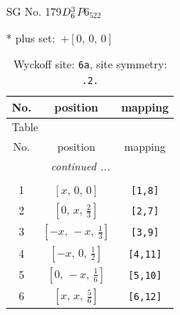 \documentclass[fleqn,8pt]{jsarticle}
\begin{document}
\setcounter{MaxMatrixCols}{32}

\renewcommand{\tablename}{Table~}
\renewcommand{\figurename}{Figure~}
\begin{center}
\LARGE
SG No. 179\quad$D_{\rm 6}^{3}$\quad$P6_522$\quad[ hexagonal ]
\end{center}
* plus set:\,\,\,$+\left[ 0,\, 0,\, 0 \right]$
\renewcommand{\arraystretch}{1.2}
\begin{longtable}{ccc}
\caption{Wyckoff site: {\tt 6a}, site symmetry: {\tt .2.}}
 \\
 \hline \hline
No. & position & mapping \\ \hline \endfirsthead

\multicolumn{2}{l}{\tablename\ \thetable{}} \\
 \hline \hline
No. & position & mapping \\ \hline \endhead

 \hline \hline
\multicolumn{2}{r}{\footnotesize\it continued ...} \\ \endfoot

 \hline \hline
\multicolumn{2}{r}{} \\ \endlastfoot

1 & $\left[ x,\, 0,\, 0 \right]$ & {\tt [1,8]} \\ \hline
2 & $\left[ 0,\, x,\, \frac{2}{3} \right]$ & {\tt [2,7]} \\ \hline
3 & $\left[ - x,\, - x,\, \frac{1}{3} \right]$ & {\tt [3,9]} \\ \hline
4 & $\left[ - x,\, 0,\, \frac{1}{2} \right]$ & {\tt [4,11]} \\ \hline
5 & $\left[ 0,\, - x,\, \frac{1}{6} \right]$ & {\tt [5,10]} \\ \hline
6 & $\left[ x,\, x,\, \frac{5}{6} \right]$ & {\tt [6,12]} \\
\end{longtable}
\renewcommand{\arraystretch}{1.2}
\end{document}
